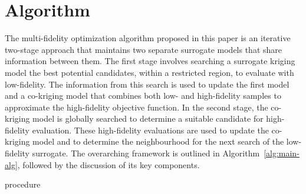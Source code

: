 \section{\AlgName{} Algorithm}\label{sec:method}
The multi-fidelity optimization algorithm proposed in this paper is an iterative two-stage approach that maintains two separate surrogate models that share information between them. The first stage involves searching a surrogate kriging model the best potential candidates, within a restricted region, to evaluate with low-fidelity. The information from this search is used to update the first model and a co-kriging model that combines both low- and high-fidelity samples to approximate the high-fidelity objective function. In the second stage, the co-kriging model is globally searched to determine a suitable candidate for high-fidelity evaluation. These high-fidelity evaluations are used to update the co-kriging model and to determine the neighbourhood for the next search of the low-fidelity surrogate. The overarching framework is outlined in Algorithm~\ref{alg:main-alg}, followed by the discussion of its key components.  


\begin{algorithm}[h!]
\caption{\AlgName{} procedure}
\label{alg:main-alg}
{\footnotesize 
\begin{algorithmic}[1]
 
 
  
   
   
   
   
   
   
   
   
     
  \ENDIF
\ENDWHILE
\end{algorithmic}
}
\end{algorithm}

